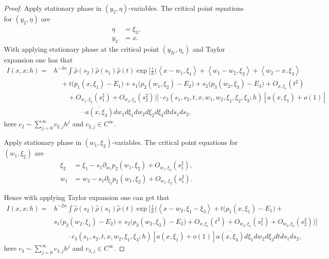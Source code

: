\documentclass[12pt,reqno]{amsart}
\numberwithin{equation}{section}
\begin{document}
\begin{proof}
Apply stationary phase in $(y_2, \eta)$-variables. The critical point equations for $(y_2, \eta)$ are
\begin{align}
\eta&=\xi_3, \\
y_2&=x.
\end{align}
With applying stationary phase at the critical point $(y_{2c}, \eta_{c})$ and Taylor expansion one has that
\begin{align*}
I (x,x; h)=&h^{-3n}\int \hat{\rho}(s_2)\hat{\rho}(s_1)\hat{\rho}(t)  \exp\Big[\frac{i}h\Big(\left<x-w_1, \xi_1\right>+\left<w_1-w_2,\xi_2\right>+\left<w_2-x,\xi_3\right> \nonumber \\
&\quad +t(p_1(x,\xi_1)-E_1\big)+ s_1\big(p_2(w_1,\xi_2)-E_2\big) +s_2\big( p_3(w_2,\xi_3)-E_3 \big)+O_{x,\xi_1}(t^2) \nonumber\\
&\quad\quad + O_{w_1,\xi_2}(s_1^2)+O_{w_2,\xi_3}(s_2^2) \Big)\Big]\cdot c_2(s_1, s_2,t,x, w_1,w_2,\xi_1,\xi_2,\xi_3;h) [a(x, \xi_1)+o(1)]  \nonumber\\
&\quad\qquad\quad \cdot \overline{a(x, \xi_3)} dw_1 d\xi_1 dw_2 d\xi_2 d\xi_3 dt ds_1 ds_2, 
\end{align*}
here $c_2\sim \sum_{j=0}^\infty c_{2,j} h^j$ and $c_{2,j}\in C^\infty$.

Apply stationary phase in $(w_1, \xi_2)$-variables. The critical point equations for $(w_1,\xi_2)$ are
\begin{align}
\xi_2&=\xi_1-s_1\partial_{w_1} p_2(w_1,\xi_2)+ O_{w_1,\xi_2}(s_1^2), \\
w_1&=w_2-s_1\partial_{\xi_2} p_2(w_1,\xi_2)+ O_{w_1, \xi_2}(s_1^2).
\end{align}

Hence with applying Taylor expansion one can get that
\begin{align*}
I (x,x; h)=&h^{-2n}\int \hat{\rho}(s_2)\hat{\rho}(s_1)\hat{\rho}(t)  \exp\Big[\frac{i}h\Big(\left<x-w_2, \xi_1-\xi_3\right>+t(p_1(x,\xi_1)-E_1\big)+ \nonumber \\
&  s_1\big(p_2(w_2,\xi_1)-E_2\big)+s_2\big( p_3(w_2,\xi_3)-E_3 \big)+O_{x,\xi_1}(t^2)+ O_{w_2,\xi_1}(s_1^2)+O_{w_2,\xi_3}(s_2^2) \Big)\Big] \nonumber\\
&\qquad \cdot c_3(s_1,s_2,t,x,w_2,\xi_1, \xi_3;h)[a(x, \xi_1)+o(1)] \overline{a(x, \xi_3)} d\xi_1 dw_2 d\xi_3 dt ds_1 ds_2,
\end{align*}
here $c_3\sim \sum_{j=0}^\infty c_{3,j} h^j$ and $c_{3,j}\in C^\infty$.


\end{proof}
\end{document}

